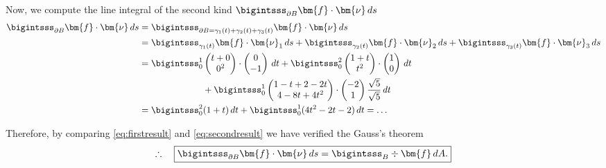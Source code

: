 \documentclass[12pt]{article}
\begin{document}
\begin{enumerate}[(i)]
	      Now, we compute the line integral of the second kind
	      $\bigintsss_{\partial B} \bm{f}\cdot \bm{\nu} \, ds$
	      \begin{align}
		      \label{eq:secondresult}
		      \bigintsss_{\partial B} \bm{f}\cdot\bm{\nu} \, ds
		       & =
		      \bigintsss_{\partial B = \gamma_1(t) + \gamma_2(t) + \gamma_3(t)} \bm{f}\cdot\bm{\nu} \, ds
		      \\
		       & =
		      \bigintsss_{\gamma_1(t)} \bm{f}\cdot\bm{\nu}_1 \, ds +
		      \bigintsss_{\gamma_2(t)} \bm{f}\cdot\bm{\nu}_2 \, ds +
		      \bigintsss_{\gamma_3(t)} \bm{f}\cdot\bm{\nu}_3 \, ds                                  \\
		       & =\bigintsss_0^1
		      \begin{pmatrix}t+0 \\0^2 \end{pmatrix} \cdot \begin{pmatrix}0 \\-1 \end{pmatrix} \, dt
		      + \bigintsss_0^2
		      \begin{pmatrix}1+t \\t^2 \end{pmatrix} \cdot \begin{pmatrix}1 \\0 \end{pmatrix} \, dt \\
		       & \quad\quad\quad\quad\quad\quad\quad
		      + \bigintsss_0^1
		      \begin{pmatrix}1-t+2-2t \\ 4-8t+4t^2\end{pmatrix} \cdot \begin{pmatrix}-2\\1\end{pmatrix}
		      \frac{\sqrt{5}}{\sqrt{5}} \, dt                                                       \\
		       & =\bigintsss_0^2 (1+t) \, dt
		      + \bigintsss_0^1 (4t^2-2t-2) \, dt
		      = \dots
	      \end{align}
\end{enumerate}


Therefore, by comparing 
\eqref{eq:firstresult} and \eqref{eq:secondresult}
we have verified the Gauss's theorem
\begin{align}
	\therefore\quad
	\boxed{
		\bigintsss_{\partial B} \bm{f} \cdot \bm{\nu} \, ds
		= \bigintsss_B \div \bm{f} \, dA.
	}
\end{align}



% 
\end{document}
